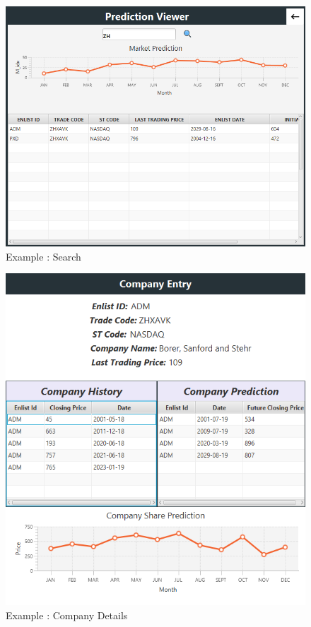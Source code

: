\documentclass{article}[12pt]
\begin{document}
    \begin{figure}[!h]
        \centering
        \includegraphics[width=.9\textwidth]{Images/SS2_Search.PNG}
        \caption{Example : Search}
        \label{fig:Search}
    \end{figure}
    
    \begin{figure}[!h]
        \centering
        \includegraphics[width=.9\textwidth]{Images/SS3_Details.PNG}
        \caption{Example : Company Details}
        \label{fig:complanyDetails}
    \end{figure}
    
\end{document}
